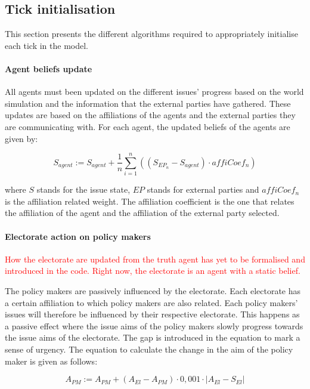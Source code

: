\subsection{Tick initialisation}

This section presents the different algorithms required to appropriately initialise each tick in the model.

\paragraph{Agent beliefs update}

All agents must been updated on the different issues' progress based on the world simulation and the information that the external parties have gathered. These updates are based on the affiliations of the agents and the external parties they are communicating with. For each agent, the updated beliefs of the agents are given by:

\begin{equation}
S_{agent} := S_{agent} + \frac{1}{n} \sum_{i=1}^n \left( \left(S_{EP_n} - S_{agent} \right) \cdot affiCoef_n \right)
\end{equation}

where $S$ stands for the issue state, $EP$ stands for external parties and $affiCoef_n$ is the affiliation related weight. The affiliation coefficient is the one that relates the affiliation of the agent and the affiliation of the external party selected.

\paragraph{Electorate action on policy makers}

\textcolor{red}{How the electorate are updated from the truth agent has yet to be formalised and introduced in the code. Right now, the electorate is an agent with a static belief.}

The policy makers are passively influenced by the electorate. Each electorate has a certain affiliation to which policy makers are also related. Each policy makers' issues will therefore be influenced by their respective electorate. This happens as a passive effect where the issue aims of the policy makers slowly progress towards the issue aims of the electorate. The gap is introduced in the equation to mark a sense of urgency. The equation to calculate the change in the aim of the policy maker is given as follows:

\begin{equation}
A_{PM} := A_{PM} + \left(A_{El} - A_{PM} \right) \cdot 0,001 \cdot \left| A_{El} - S_{El} \right|
\end{equation}

